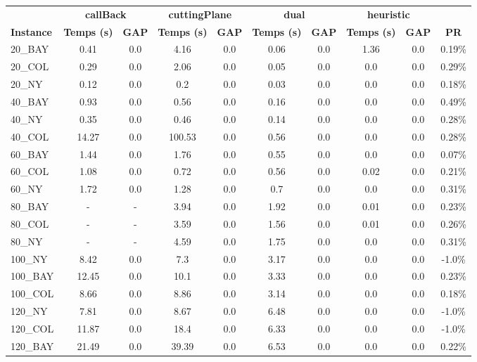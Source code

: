 \documentclass[main.tex]{subfiles}
\begin{document}
\begin{center}
\renewcommand{\arraystretch}{1.4} 
 \begin{tabular}{lccccccccc}
	\hline
 & \multicolumn{2}{c}{\textbf{callBack}} & \multicolumn{2}{c}{\textbf{cuttingPlane}} & \multicolumn{2}{c}{\textbf{dual}} & \multicolumn{2}{c}{\textbf{heuristic}}\\
\textbf{Instance}  & \textbf{Temps (s)} & \textbf{GAP} & \textbf{Temps (s)} & \textbf{GAP} & \textbf{Temps (s)} & \textbf{GAP} & \textbf{Temps (s)} & \textbf{GAP} & \textbf{PR} \\\hline

20\_BAY & 0.41 & 0.0 & 4.16 & 0.0 & 0.06 & 0.0 & 1.36 & 0.0 & 0.19\%\\
20\_COL & 0.29 & 0.0 & 2.06 & 0.0 & 0.05 & 0.0 & 0.0 & 0.0 & 0.29\%\\
20\_NY & 0.12 & 0.0 & 0.2 & 0.0 & 0.03 & 0.0 & 0.0 & 0.0 & 0.18\%\\
40\_BAY & 0.93 & 0.0 & 0.56 & 0.0 & 0.16 & 0.0 & 0.0 & 0.0 & 0.49\%\\
40\_NY & 0.35 & 0.0 & 0.46 & 0.0 & 0.14 & 0.0 & 0.0 & 0.0 & 0.28\%\\
40\_COL & 14.27 & 0.0 & 100.53 & 0.0 & 0.56 & 0.0 & 0.0 & 0.0 & 0.28\%\\
60\_BAY & 1.44 & 0.0 & 1.76 & 0.0 & 0.55 & 0.0 & 0.0 & 0.0 & 0.07\%\\
60\_COL & 1.08 & 0.0 & 0.72 & 0.0 & 0.56 & 0.0 & 0.02 & 0.0 & 0.21\%\\
60\_NY & 1.72 & 0.0 & 1.28 & 0.0 & 0.7 & 0.0 & 0.0 & 0.0 & 0.31\%\\
80\_BAY & - & - 
 & 3.94 & 0.0 & 1.92 & 0.0 & 0.01 & 0.0 & 0.23\%\\
80\_COL & - & - 
 & 3.59 & 0.0 & 1.56 & 0.0 & 0.01 & 0.0 & 0.26\%\\
80\_NY & - & - 
 & 4.59 & 0.0 & 1.75 & 0.0 & 0.0 & 0.0 & 0.31\%\\
100\_NY & 8.42 & 0.0 & 7.3 & 0.0 & 3.17 & 0.0 & 0.0 & 0.0 & -1.0\%\\
100\_BAY & 12.45 & 0.0 & 10.1 & 0.0 & 3.33 & 0.0 & 0.0 & 0.0 & 0.23\%\\
100\_COL & 8.66 & 0.0 & 8.86 & 0.0 & 3.14 & 0.0 & 0.0 & 0.0 & 0.18\%\\
120\_NY & 7.81 & 0.0 & 8.67 & 0.0 & 6.48 & 0.0 & 0.0 & 0.0 & -1.0\%\\
120\_COL & 11.87 & 0.0 & 18.4 & 0.0 & 6.33 & 0.0 & 0.0 & 0.0 & -1.0\%\\
120\_BAY & 21.49 & 0.0 & 39.39 & 0.0 & 6.53 & 0.0 & 0.0 & 0.0 & 0.22\%\\

\end{tabular}
\end{center}
\end{document}
